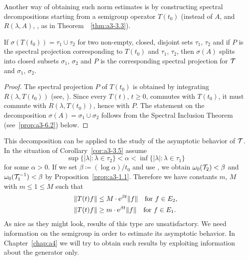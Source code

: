 Another way of obtaining such norm estimates is by constructing spectral decompositions starting from a semigroup operator $T(t_{0})$ (instead of\/ $A$, and $R(\lambda,A)$, \resp, as in Theorem~~\ref{thm:a3-3.3}).
\begin{corollary}\label{cor:a3-3.5}
If\/ $\sigma(T(t_{0})) = \tau_{1} \cup \tau_{2}$ for two non-empty, closed, disjoint sets $\tau_{1}$, $\tau_{2}$ and if\/ $P$ is the spectral projection corresponding to $T(t_{0})$ and $\tau_{1}$, $\tau_{2}$, then $\sigma(A)$ splits into closed subsets $\sigma_{1}$, $\sigma_{2}$ and $P$ is the corresponding spectral projection for $\mathcal{T}$ and $\sigma_{1}$, $\sigma_{2}$.
\end{corollary}
\begin{proof}
The spectral projection $P$ of\/ $T(t_{0})$ is obtained by integrating $R(\lambda,T(t_{0}))$ (see, \eg \textcite[Section VII.3]{dunfordschwartz:1958}).
Since every $T(t)$, $t \geq 0$, commutes with $T(t_{0})$, it must commute with $R(\lambda,T(t_{0}))$, hence with $P$.
The statement on the decomposition $\sigma(A) = \sigma_{1} \cup \sigma_{2}$ follows from the Spectral Inclusion Theorem (see~\ref{prop:a3-6.2}) below.
\end{proof}
This decomposition can be applied to the study of the asymptotic behavior of\/ $\mathcal{T}$. In the situation of Corollary~\ref{cor:a3-3.5} assume
\[
\sup \{|\lambda| \colon \lambda \in \tau_{2}\} < \alpha < \inf \{|\lambda| \colon \lambda \in \tau_{1}\} 
\]
for some $\alpha > 0$. 
If we set $\beta \coloneq (\log\alpha)/t_{0}$ and use 
\textcite[Chap.I, Theorem~6.5]{pazy:1983}, 
we obtain $\omega_{0}(\mathcal{T}_{2}) < \beta$ and $\omega_{0}(\mathcal{T}_{1}^{-1}) < \beta$ by Proposition~\ref{prop:a3-1.1}.
Therefore we have constants $m$, $M$ with $m  \leq 1  \leq M $ such that
\begin{align*}
	\|T(t)f\| &\leq M \cdot \eu^{\beta t}\|f\| \quad \text{for } f \in E_{2} , \\
	\|T(t)f\| &\geq m \cdot \eu^{\beta t}\|f\| \quad \text{for } f \in E_{1} .
\end{align*}
As nice as they might look, results of this type are unsatisfactory. We need information on the semigroup in order to estimate its asymptotic behavior.
In Chapter~\ref{chap:a4} we will try to obtain such results by exploiting information about the generator only.
